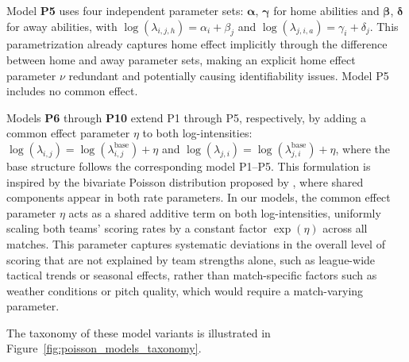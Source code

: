 Model \textbf{P5} uses four independent parameter sets: $\boldsymbol{\alpha}$, $\boldsymbol{\gamma}$ for home abilities and $\boldsymbol{\beta}$, $\boldsymbol{\delta}$ for away abilities, with $\log(\lambda_{i,j,h}) = \alpha_i + \beta_j$ and $\log(\lambda_{j,i,a}) = \gamma_i + \delta_j$.
This parametrization already captures home effect implicitly through the difference between home and away parameter sets, making an explicit home effect parameter $\nu$ redundant and potentially causing identifiability issues.
Model P5 includes no common effect.

Models \textbf{P6} through \textbf{P10} extend P1 through P5, respectively, by adding a common effect parameter $\eta$ to both log-intensities: $\log(\lambda_{i,j}) = \log(\lambda_{i,j}^{\text{base}}) + \eta$ and $\log(\lambda_{j,i}) = \log(\lambda_{j,i}^{\text{base}}) + \eta$, where the base structure follows the corresponding model P1--P5.
This formulation is inspired by the bivariate Poisson distribution proposed by \textcite{holgate_1964}, where shared components appear in both rate parameters.
In our models, the common effect parameter $\eta$ acts as a shared additive term on both log-intensities, uniformly scaling both teams' scoring rates by a constant factor $\exp(\eta)$ across all matches.
This parameter captures systematic deviations in the overall level of scoring that are not explained by team strengths alone, such as league-wide tactical trends or seasonal effects, rather than match-specific factors such as weather conditions or pitch quality, which would require a match-varying parameter.

The taxonomy of these model variants is illustrated in Figure~\ref{fig:poisson_models_taxonomy}.

